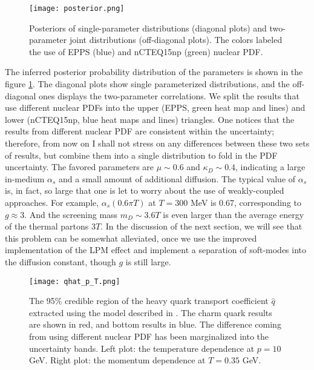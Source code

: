 \begin{figure}
\singlespacing
\centering
\texttt{[image: posterior.png]}
\caption[Posteriors of single-parameter distributions (diagonal plots) and]{Posteriors of single-parameter distributions (diagonal plots) and two-parameter joint distributions (off-diagonal plots). The colors labeled the use of EPPS (blue) and nCTEQ15np (green) nuclear PDF.}
\label{fig:LBT:posterior}
\end{figure}

The inferred posterior probability distribution of the parameters is shown in the figure \ref{fig:LBT:posterior}.
The diagonal plots show single parameterized distributions, and the off-diagonal ones displays the two-parameter correlations.
We split the results that use different nuclear PDFs into the upper (EPPS, green heat map and lines) and lower (nCTEQ15np, blue heat maps and lines) triangles.
One notices that the results from different nuclear PDF are consistent within the uncertainty; therefore, from now on I shall not stress on any differences between these two sets of results, but combine them into a single distribution to fold in the PDF uncertainty.
The favored parameters are $\mu \sim 0.6$ and $\kappa_D \sim 0.4$, indicating a large in-medium $\alpha_s$ and a small amount of additional diffusion.
The typical value of $\alpha_s$ is, in fact, so large that one is let to worry about the use of weakly-coupled approaches.
For example, $\alpha_s(0.6\pi T)$ at $T=300$ MeV is 0.67, corresponding to $g \approx 3$. 
And the screening mass $m_D \sim 3.6 T$ is even larger than the average energy of the thermal partons $3T$. 
In the discussion of the next section, we will see that this problem can be somewhat alleviated, once we use the improved implementation of the LPM effect and implement a separation of soft-modes into the diffusion constant, though $g$ is still large.

\begin{figure}
\singlespacing
\centering
\texttt{[image: qhat\_p\_T.png]}
\caption[The 95\% credible region of the heavy quark transport coefficient]{The 95\% credible region of the heavy quark transport coefficient $\hat{q}$ extracted using the model described in \cite{Ke:2018tsh}.
The charm quark results are shown in red, and bottom results in blue.
The difference coming from using different nuclear PDF has been marginalized into the uncertainty bands.
Left plot: the temperature dependence at $p=10$ GeV. Right plot: the momentum dependence at $T=0.35$ GeV.
}\label{fig:LBT:posterior_qhat}
\end{figure}

